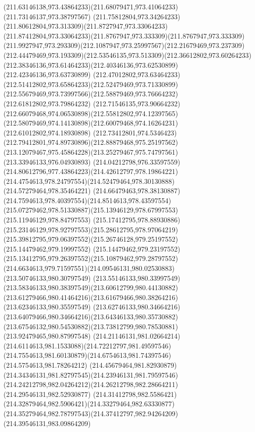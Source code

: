 {{\curveto(211.63146138,973.43864233)(211.68079471,973.41064233)(211.73146137,973.38797567)
\curveto(211.75812804,973.34264233)(211.80612804,973.313309)(211.8727947,973.33064233)
\curveto(211.87412804,973.33064233)(211.8767947,973.333309)(211.8767947,973.333309)
\curveto(211.9927947,973.293309)(212.1087947,973.25997567)(212.21679469,973.237309)
\curveto(212.44479469,973.193309)(212.53546135,973.513309)(212.36612802,973.60264233)
\curveto(212.38346136,973.61464233)(212.40346136,973.62530899)(212.42346136,973.63730899)
\curveto(212.47012802,973.63464233)(212.51412802,973.65864233)(212.52479469,973.71330899)
\curveto(212.55679469,973.73997566)(212.58879469,973.76664232)(212.61812802,973.79864232)
\curveto(212.71546135,973.90664232)(212.66079468,974.06530898)(212.55812802,974.12397565)
\curveto(212.58079469,974.14130898)(212.60079468,974.16264231)(212.61012802,974.18930898)
\curveto(212.73412801,974.5346423)(212.79412801,974.89730896)(212.88879468,975.25197562)
\curveto(213.12079467,975.45864228)(213.25279467,975.74797561)(213.33946133,976.04930893)
\curveto(214.04212798,976.33597559)(214.80612796,977.43864223)(214.42612797,978.19864221)
\curveto(214.4754613,978.24797554)(214.52479464,978.30130888)(214.57279464,978.35464221)
\curveto(214.66479463,978.38130887)(214.7594613,978.40397554)(214.8514613,978.43597554)
\curveto(215.07279462,978.51330887)(215.13946129,978.67997553)(215.11946129,978.84797553)
\curveto(215.17412795,978.88930886)(215.23146129,978.92797553)(215.28612795,978.97064219)
\curveto(215.39812795,979.06397552)(215.26746128,979.25197552)(215.14479462,979.19997552)
\curveto(215.14479462,979.23197552)(215.13412795,979.26397552)(215.10879462,979.28797552)
\curveto(214.6634613,979.71597551)(214.09546131,980.02530883)(213.50746133,980.30797549)
\curveto(213.55146133,980.33997549)(213.58346133,980.38397549)(213.60612799,980.44130882)
\curveto(213.61279466,980.41464216)(213.61679466,980.38264216)(213.62346133,980.35597549)
\curveto(213.62746133,980.34664216)(213.64079466,980.34664216)(213.64346133,980.35730882)
\curveto(213.67546132,980.54530882)(213.73812799,980.78530881)(213.92479465,980.87997548)
\curveto(214.21146131,981.02664214)(214.6114613,981.1533088)(214.72212797,981.49597546)
\curveto(214.7554613,981.60130879)(214.6754613,981.74397546)(214.5754613,981.78264212)
\curveto(214.45679464,981.82930879)(214.34346131,981.82797545)(214.23946131,981.79597546)
\curveto(214.24212798,982.04264212)(214.26212798,982.28664211)(214.29546131,982.52930877)
\curveto(214.31412798,982.5586421)(214.32879464,982.5906421)(214.33279464,982.63330877)
\curveto(214.35279464,982.78797543)(214.37412797,982.94264209)(214.39546131,983.09864209)
}}
